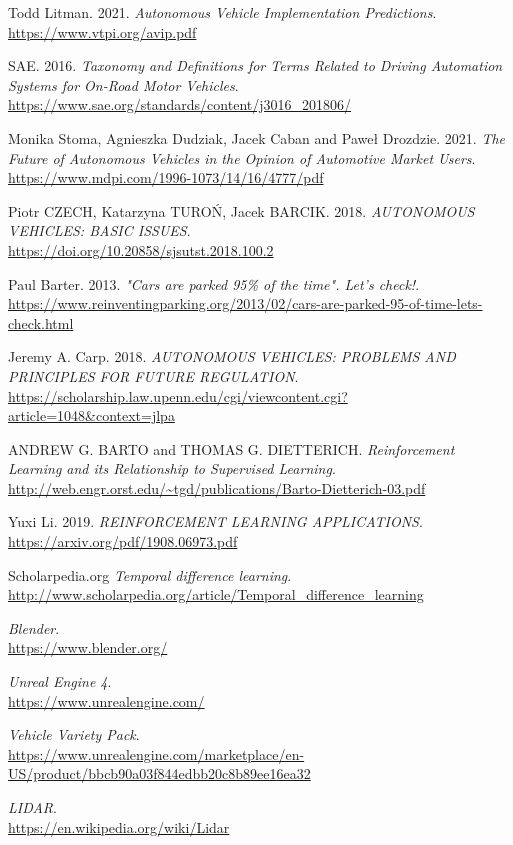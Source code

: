 \documentclass[14pt]{extarticle}
\begin{document}
\newpage
\begin{thebibliography}{999}

  Todd Litman. 2021.
  \emph{Autonomous Vehicle Implementation Predictions}.\\
  \url{https://www.vtpi.org/avip.pdf}
  
  SAE. 2016.
  \emph{Taxonomy and Definitions for Terms Related to Driving Automation Systems for On-Road Motor Vehicles}.\\
  \url{https://www.sae.org/standards/content/j3016_201806/}
   
  Monika Stoma, Agnieszka Dudziak, Jacek Caban and Paweł Drozdzie. 2021.
  \emph{The Future of Autonomous Vehicles in the Opinion of Automotive
Market Users}.\\
  \url{https://www.mdpi.com/1996-1073/14/16/4777/pdf}
   
  Piotr CZECH, Katarzyna TUROŃ, Jacek BARCIK. 2018.
  \emph{AUTONOMOUS VEHICLES: BASIC ISSUES}.\\
  \url{https://doi.org/10.20858/sjsutst.2018.100.2}
  
  Paul Barter. 2013.
  \emph{"Cars are parked 95\% of the time". Let's check!}.\\
  \url{https://www.reinventingparking.org/2013/02/cars-are-parked-95-of-time-lets-check.html}
  
  Jeremy A. Carp. 2018.
  \emph{AUTONOMOUS VEHICLES: PROBLEMS AND PRINCIPLES FOR FUTURE REGULATION}.\\
  \url{https://scholarship.law.upenn.edu/cgi/viewcontent.cgi?article=1048&context=jlpa}
 
  ANDREW G. BARTO and THOMAS G. DIETTERICH.
  \emph{Reinforcement Learning and its Relationship to Supervised Learning}.\\
  \url{http://web.engr.orst.edu/~tgd/publications/Barto-Dietterich-03.pdf}
  
  Yuxi Li. 2019.
  \emph{REINFORCEMENT LEARNING APPLICATIONS}.\\
  \url{https://arxiv.org/pdf/1908.06973.pdf}
  
  Scholarpedia.org
  \emph{Temporal difference learning}.\\
  \url{http://www.scholarpedia.org/article/Temporal_difference_learning}
 
  \emph{Blender}.\\
  \url{https://www.blender.org/}
   
  \emph{Unreal Engine 4}.\\
  \url{https://www.unrealengine.com/}
   
   
  \emph{Vehicle Variety Pack}.\\
  \url{https://www.unrealengine.com/marketplace/en-US/product/bbcb90a03f844edbb20c8b89ee16ea32}
  
  \emph{LIDAR}.\\
  \url{https://en.wikipedia.org/wiki/Lidar}
   

\end{thebibliography}
\end{document}
